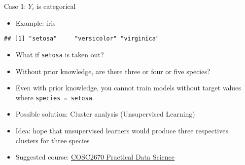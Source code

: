 \documentclass[ignorenonframetext,]{beamer}
\newenvironment{Shaded}{\begin{snugshade}}{\end{snugshade}}
\newcommand{\KeywordTok}[1]{\textcolor[rgb]{0.13,0.29,0.53}{\textbf{#1}}}
\newcommand{\StringTok}[1]{\textcolor[rgb]{0.31,0.60,0.02}{#1}}
\newcommand{\OperatorTok}[1]{\textcolor[rgb]{0.81,0.36,0.00}{\textbf{#1}}}
\newcommand{\NormalTok}[1]{#1}
\providecommand{\tightlist}{%
  \setlength{\itemsep}{0pt}\setlength{\parskip}{0pt}}
\begin{document}
\begin{frame}[fragile]{Case 1: \(Y_{i}\) is categorical}

\begin{itemize}[<+->]
\tightlist
\item
  Example: iris
\end{itemize}

\begin{Shaded}
\end{Shaded}

\begin{verbatim}
## [1] "setosa"     "versicolor" "virginica"
\end{verbatim}

\begin{itemize}[<+->]
\tightlist
\item
  What if \texttt{setosa} is taken out?
\item
  Without prior knowledge, are there three or four or five species?
\item
  Even with prior knowledge, you cannot train models without target
  values where \texttt{species\ =\ setosa}.
\item
  Possible solution: Cluster analysis (Unsupervised Learning)
\item
  Idea: hope that unsupervised learners would produce three respectives
  clusters for three species
\item
  Suggested course:
  \href{http://www1.rmit.edu.au/courses/051637}{COSC2670 Practical Data
  Science}
\end{itemize}

\end{frame}
\end{document}
